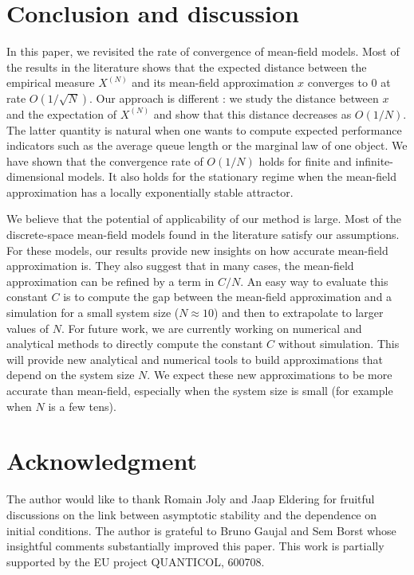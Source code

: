 \documentclass[sigconf]{acmart}
\newcommand\XN{X^{(N)}}
\begin{document}
\section{Conclusion and discussion}
\label{sec:conclusion}

In this paper, we revisited the rate of convergence of mean-field
models. Most of the results in the literature shows that the expected
distance between the empirical measure $\XN$ and its mean-field
approximation $x$ converges to $0$ at rate $O(1/\sqrt{N})$. Our
approach is different : we study the distance between $x$ and the
expectation of $\XN$ and show that this distance decreases as
$O(1/N)$. The latter quantity is natural when one wants to compute
expected performance indicators such as the average queue length or
the marginal law of one object.  We have shown that the convergence
rate of $O(1/N)$ holds for finite and infinite-dimensional models. It
also holds for the stationary regime when the mean-field approximation
has a locally exponentially stable attractor.

We believe that the potential of applicability of our method is
large. Most of the discrete-space mean-field models found in the
literature satisfy our assumptions.  For these models, our results
provide new insights on how accurate mean-field approximation is. They
also suggest that in many cases, the mean-field approximation can be
refined by a term in $C/N$.  An easy way to evaluate this constant $C$
is to compute the gap between the mean-field approximation and a
simulation for a small system size ($N\approx10$) and then to
extrapolate to larger values of $N$.  For future work, we are
currently working on numerical and analytical methods to directly
compute the constant $C$ without simulation.  This will provide new
analytical and numerical tools to build approximations that depend on
the system size $N$. We expect these new approximations to be more
accurate than mean-field, especially when the system size is small
(for example when $N$ is a few tens).

\section{Acknowledgment}

The author would like to thank Romain Joly and Jaap Eldering for
fruitful discussions on the link between asymptotic stability and
the dependence on initial conditions. The author is grateful to
Bruno Gaujal and Sem Borst whose insightful comments substantially
improved this paper.  This work is partially supported by the EU
project QUANTICOL, 600708.



\end{document}
